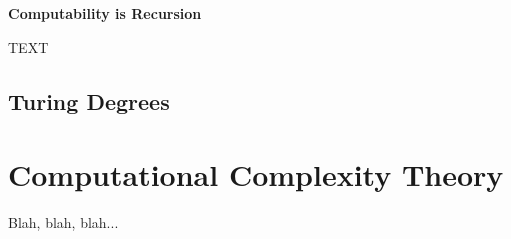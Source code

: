 




\begin{tcolorbox}[breakable, enhanced, colback=textbook-blue, sharp corners]
	\vspace{2mm}
	\begin{center}
		\textbf{Computability is Recursion}
	\end{center}
	\vspace{1mm}
	TEXT
	
	\vspace{1mm}
\end{tcolorbox}
\vspace{7mm}


\subsection{Turing Degrees}



\toclineskip
\section{Computational Complexity Theory}

Blah, blah, blah... \\

